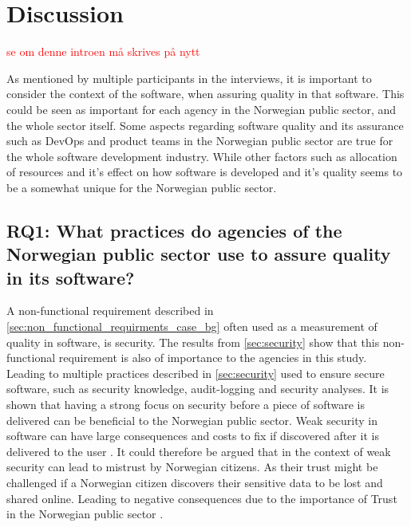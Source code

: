 \chapter{Discussion} \label{sec:discussion}

\textcolor{red}{se om denne introen må skrives på nytt}

As mentioned by multiple participants in the interviews, it is important to consider the context of the software, when assuring quality in that software. This could be seen as important for each agency in the Norwegian public sector, and the whole sector itself. Some aspects regarding software quality and its assurance such as DevOps and product teams in the Norwegian public sector are true for the whole software development industry. While other factors such as allocation of resources and it's effect on how software is developed and it's quality seems to be a somewhat unique for the Norwegian public sector.

\section{RQ1: What practices do agencies of the Norwegian public sector use to assure quality in its software?}
A non-functional requirement described in \autoref{sec:non_functional_requirments_case_bg} often used as a measurement of quality in software, is security. The results from \autoref{sec:security} show that this non-functional requirement is also of importance to the agencies in this study. Leading to multiple practices described in \autoref{sec:security} used to ensure secure software, such as security knowledge, audit-logging and security analyses. It is shown that having a strong focus on security before a piece of software is delivered can be beneficial to the Norwegian public sector. Weak security in software can have large consequences and costs to fix if discovered after it is delivered to the user \cite{csw_2011}. It could therefore be argued that in the context of weak security can lead to mistrust by Norwegian citizens. As their trust might be challenged if a Norwegian citizen discovers their sensitive data to be lost and shared online. Leading to negative consequences due to the importance of Trust in the Norwegian public sector \cite{oecd_2022}.


